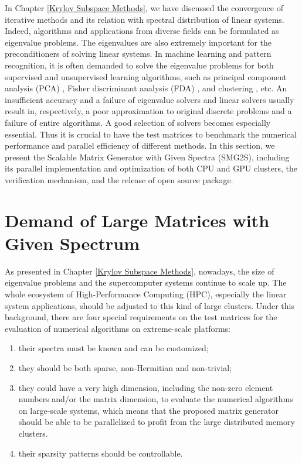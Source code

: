 \begin{displayquote}
	\textsf{In Chapter \ref{Krylov Subspace Methods}, we have discussed the convergence of iterative methods and its relation with spectral distribution of linear systems. Indeed, algorithms and applications from diverse fields can be formulated as eigenvalue problems. The eigenvalues are also extremely important for the preconditioners of solving linear systems. In machine learning and pattern recognition, it is often demanded to solve the eigenvalue problems for both supervised and unsupervised learning algorithms, such as principal component analysis (PCA) \cite{croux2000principal}, Fisher discriminant analysis (FDA) \cite{berkes2005handwritten}, and clustering \cite{fender2017parallel}, etc. An insufficient accuracy and a failure of eigenvalue solvers and linear solvers usually result in, respectively, a poor approximation to original discrete problems and a failure of entire algorithms.  A good selection of solvers becomes especially essential. Thus it is crucial to have the test matrices to benchmark the numerical performance and parallel efficiency of different methods. In this section, we present the Scalable Matrix Generator with Given Spectra (SMG2S), including its parallel implementation and optimization of both CPU and GPU clusters, the verification mechanism, and the release of open source package.}
\end{displayquote}

\vspace{0.6in}

\section{Demand of Large Matrices with Given Spectrum}

As presented in Chapter \ref{Krylov Subspace Methods}, nowadays, the size of eigenvalue problems and the supercomputer systems continue to scale up. The whole ecosystem of High-Performance Computing (HPC), especially the linear system applications, should be adjusted to this kind of large clusters. Under this background, there are four special requirements on the test matrices for the evaluation of numerical algorithms on extreme-scale platforms: 

\begin{enumerate}
	\item their spectra must be known and can be customized;
	\item they should be both sparse, non-Hermitian and non-trivial;
	\item they could have a very high dimension, including the non-zero element numbers and/or the matrix dimension, to evaluate the numerical algorithms on large-scale systems, which means that the proposed matrix generator should be able to be parallelized to profit from the large distributed memory clusters.
	\item their sparsity patterns should be controllable.
\end{enumerate}

